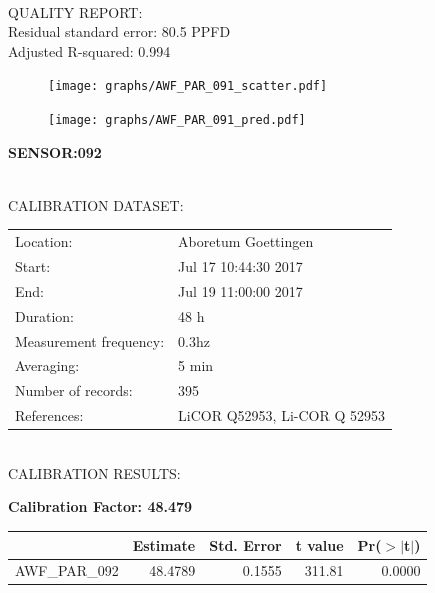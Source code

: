 \documentclass[oneside]{report}
\begin{document}
\hrulefill\\
QUALITY REPORT:\\
Residual standard error: 80.5 PPFD\\
Adjusted R-squared: 0.994



\begin{figure}[H]
  \centering
  \texttt{[image: graphs/AWF\_PAR\_091\_scatter.pdf]}
\end{figure}




\begin{figure}[H]
  \centering
  \texttt{[image: graphs/AWF\_PAR\_091\_pred.pdf]}
\end{figure}

\pagebreak


\begin{center}
\large{\textbf{SENSOR:092}}\\
\end{center}

\hrulefill\\
CALIBRATION DATASET:\\
\begin{table}[h!]
  \centering
  \label{tab:table1}
  \begin{tabular}{ll}
    Location: & Aboretum Goettingen\\ 
    
    
    Start:  & Jul 17 10:44:30 2017 \\
    End:   & Jul 19 11:00:00 2017\\ 
    Duration: & 48 h\\
    Measurement frequency: & 0.3hz\\
    Averaging:  &5 min\\
    Number of records: & 395 \\
    References: & LiCOR Q52953, Li-COR Q 52953 \\
  \end{tabular}
\end{table}

\hrulefill\\
CALIBRATION RESULTS:\\


\begin{center}
\textbf{\large{Calibration Factor: 48.479}}\\
\end{center}
\begin{table}[ht]
\centering
\begin{tabular}{rrrrr}
  \hline
 & Estimate & Std. Error & t value & Pr($>$$|$t$|$) \\ 
  \hline
AWF\_PAR\_092 & 48.4789 & 0.1555 & 311.81 & 0.0000 \\ 
   \hline
\end{tabular}
\end{table}
\end{document}
